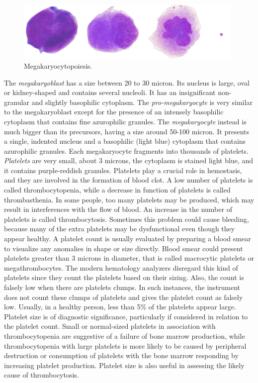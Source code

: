 \documentclass[final,a4paper,12pt,english]{UnicaPhdThesis3}
\begin{document}
{\begin{figure}[!htbp]
\centering
\includegraphics[width=0.98\textwidth]{images/megakaryopoiesis}
\caption{\label{fig:Megakaryocytopoiesis} Megakaryocytopoiesis.}
\end{figure}

The \textit{megakaryoblast} has a size between 20 to 30 micron. Its nucleus is large, oval or kidney-shaped and contains several nucleoli. It has an insignificant non-granular and slightly basophilic cytoplasm. The \textit{pro-megakaryocyte} is very similar to the megakaryoblast except for the presence of an intensely basophilic cytoplasm that contains fine azurophilic granules. The \textit{megakaryocyte} instead is much bigger than its precursors, having a size around 50-100 micron. It presents a single, indented nucleus and a basophilic (light blue) cytoplasm that contains azurophilic granules.
Each megakaryocyte fragments into thousands of platelets. \textit{Platelets} are very small, about 3 microns, the cytoplasm is stained light blue, and it contains purple-reddish granules. Platelets play a crucial role in hemostasis, and they are involved in the formation of blood clot. A low number of platelets is called thrombocytopenia, while a decrease in function of platelets is called thrombasthenia. In some people, too many platelets may be produced, which may result in interferences with the flow of blood.
An increase in the number of platelets is called thrombocytosis. Sometimes this problem could cause bleeding, because many of the extra platelets may be dysfunctional even though they appear healthy. A platelet count is usually evaluated by preparing a blood smear to visualize any anomalies in shape or size directly. Blood smear could present platelets greater than 3 microns in diameter, that is called macrocytic platelets or megathrombocytes. The modern hematology analyzers disregard this kind of platelets since they count the platelets based on their sizing. Also, the count is falsely low when there are platelets clumps. In such instances, the instrument does not count these clumps of platelets and gives the platelet count as falsely low. Usually, in a healthy person, less than 5\% of the platelets appear large. Platelet size is of diagnostic significance, particularly if considered in relation to the platelet count. Small or normal-sized platelets in association with thrombocytopenia are suggestive of a failure of bone marrow production, while thrombocytopenia with large platelets is more likely to be caused by peripheral destruction or consumption of platelets with the bone marrow responding by increasing platelet production. Platelet size is also useful in assessing the likely cause of thrombocytosis. 

}
\end{document}
